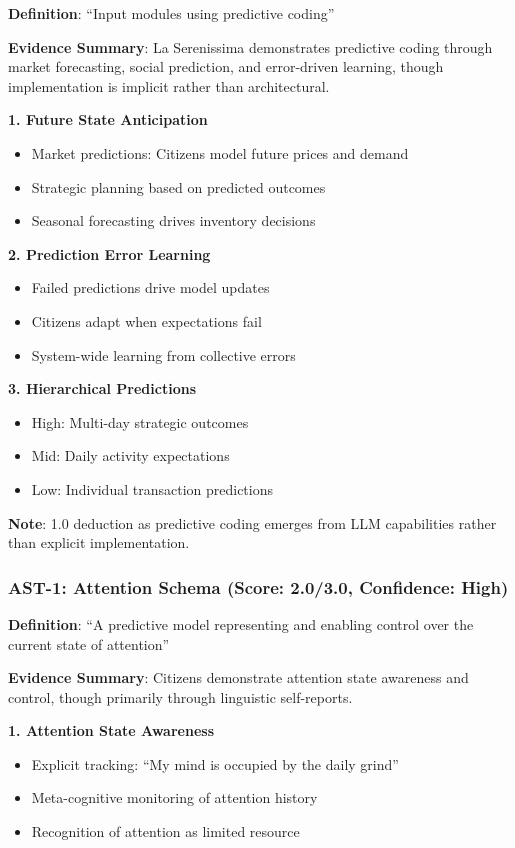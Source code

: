 \documentclass[12pt,a4paper]{article}
\begin{document}
\textbf{Definition}: ``Input modules using predictive coding''

\textbf{Evidence Summary}: La Serenissima demonstrates predictive coding through market forecasting, social prediction, and error-driven learning, though implementation is implicit rather than architectural.

\textbf{1. Future State Anticipation}
\begin{itemize}
    \item Market predictions: Citizens model future prices and demand
    \item Strategic planning based on predicted outcomes
    \item Seasonal forecasting drives inventory decisions
\end{itemize}

\textbf{2. Prediction Error Learning}
\begin{itemize}
    \item Failed predictions drive model updates
    \item Citizens adapt when expectations fail
    \item System-wide learning from collective errors
\end{itemize}

\textbf{3. Hierarchical Predictions}
\begin{itemize}
    \item High: Multi-day strategic outcomes
    \item Mid: Daily activity expectations
    \item Low: Individual transaction predictions
\end{itemize}

\textbf{Note}: 1.0 deduction as predictive coding emerges from LLM capabilities rather than explicit implementation.

\subsubsection{AST-1: Attention Schema (Score: 2.0/3.0, Confidence: High)}

\textbf{Definition}: ``A predictive model representing and enabling control over the current state of attention''

\textbf{Evidence Summary}: Citizens demonstrate attention state awareness and control, though primarily through linguistic self-reports.

\textbf{1. Attention State Awareness}
\begin{itemize}
    \item Explicit tracking: ``My mind is occupied by the daily grind''
    \item Meta-cognitive monitoring of attention history
    \item Recognition of attention as limited resource
\end{itemize}
\end{document}

